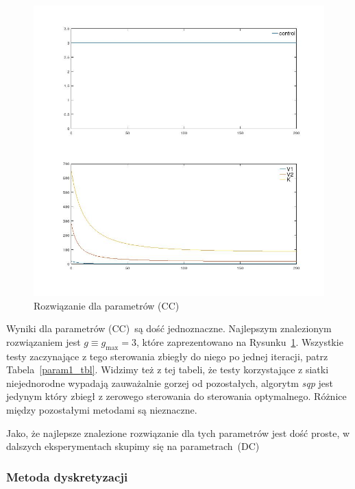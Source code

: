 \documentclass[11pt]{article}
\begin{document}
\begin{figure}[h]
  \centering
  \includegraphics[width=.5\textwidth]{../plots/plot_max}
  \caption{Rozwiązanie dla parametrów (CC)}\label{max_plot}
\end{figure}

Wyniki dla parametrów (CC)\ są dość jednoznaczne. Najlepszym znalezionym rozwiązaniem jest $g \equiv g_{\max} = 3$, które zaprezentowano na Rysunku~\ref{max_plot}. Wszystkie testy zaczynające z tego sterowania zbiegły do niego po jednej iteracji, patrz Tabela~\ref{param1_tbl}. Widzimy też z tej tabeli, że testy korzystające z siatki niejednorodne wypadają zauważalnie gorzej od pozostałych, algorytm {\it sqp\/} jest jedynym który zbiegł z zerowego sterowania do sterowania optymalnego. Różnice między pozostałymi metodami są nieznaczne.

Jako, że najlepsze znalezione rozwiązanie dla tych parametrów jest dość proste, w dalszych eksperymentach skupimy się na parametrach~(DC)

\subsubsection{Metoda dyskretyzacji}
\end{document}

